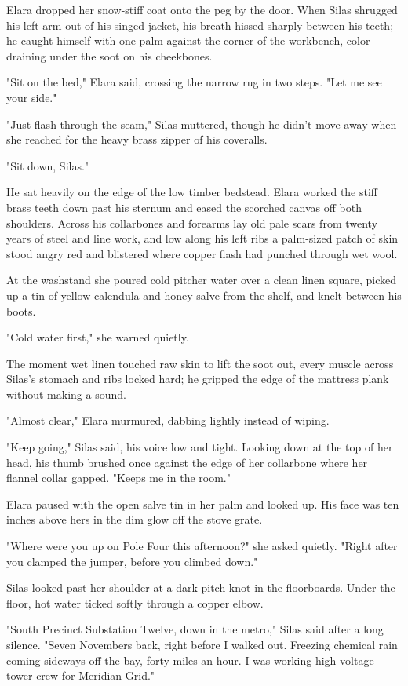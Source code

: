 Elara dropped her snow-stiff coat onto the peg by the door. When Silas shrugged his left arm out of his singed jacket, his breath hissed sharply between his teeth; he caught himself with one palm against the corner of the workbench, color draining under the soot on his cheekbones.

"Sit on the bed," Elara said, crossing the narrow rug in two steps. "Let me see your side."

"Just flash through the seam," Silas muttered, though he didn't move away when she reached for the heavy brass zipper of his coveralls.

"Sit down, Silas."

He sat heavily on the edge of the low timber bedstead. Elara worked the stiff brass teeth down past his sternum and eased the scorched canvas off both shoulders. Across his collarbones and forearms lay old pale scars from twenty years of steel and line work, and low along his left ribs a palm-sized patch of skin stood angry red and blistered where copper flash had punched through wet wool.

At the washstand she poured cold pitcher water over a clean linen square, picked up a tin of yellow calendula-and-honey salve from the shelf, and knelt between his boots.

"Cold water first," she warned quietly.

The moment wet linen touched raw skin to lift the soot out, every muscle across Silas's stomach and ribs locked hard; he gripped the edge of the mattress plank without making a sound.

"Almost clear," Elara murmured, dabbing lightly instead of wiping.

"Keep going," Silas said, his voice low and tight. Looking down at the top of her head, his thumb brushed once against the edge of her collarbone where her flannel collar gapped. "Keeps me in the room."

Elara paused with the open salve tin in her palm and looked up. His face was ten inches above hers in the dim glow off the stove grate.

"Where were you up on Pole Four this afternoon?" she asked quietly. "Right after you clamped the jumper, before you climbed down."

Silas looked past her shoulder at a dark pitch knot in the floorboards. Under the floor, hot water ticked softly through a copper elbow.

"South Precinct Substation Twelve, down in the metro," Silas said after a long silence. "Seven Novembers back, right before I walked out. Freezing chemical rain coming sideways off the bay, forty miles an hour. I was working high-voltage tower crew for Meridian Grid."


